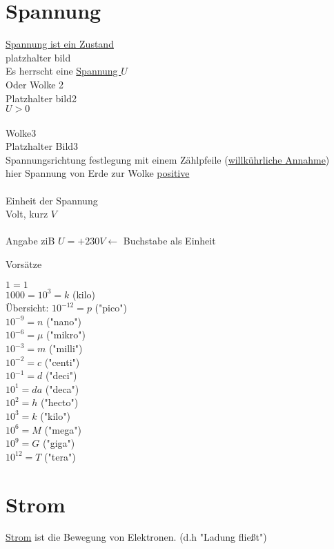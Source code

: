 \section{Spannung}
\underline{Spannung ist ein Zustand}\\
platzhalter bild\\
Es herrscht eine \underline{Spannung $U$}\\
Oder Wolke 2\\
Platzhalter bild2\\
$ U > 0 $\\
\\

Wolke3\\
Platzhalter Bild3\\

Spannungsrichtung festlegung mit einem Zählpfeile (\underline{willkührliche Annahme})\\
hier Spannung von Erde zur Wolke \underline{positive}\\
\\
Einheit der Spannung\\
Volt, kurz $V$\\
\\
Angabe ziB $U = + 230 V \leftarrow $ Buchstabe als Einheit\\

\newpage

Vorsätze

$ 1 =1 $\\
$ 1000 = 10^3 = k $ (kilo)\\
Übersicht:
$ 10^{-12} = p $ ("pico")\\
$ 10^{-9} = n $ ("nano")\\
$ 10^{-6} = \mu $ ("mikro")\\
$ 10^{-3} = m $ ("milli")\\
$ 10^{-2} = c $ ("centi")\\
$ 10^{-1} = d $ ("deci")\\
$ 10^{1} = da $ ("deca")\\
$ 10^{2} = h $ ("hecto")\\
$ 10^{3} = k $ ("kilo")\\
$ 10^{6} = M $ ("mega")\\
$ 10^{9} = G $ ("giga")\\
$ 10^{12} = T $ ("tera")\\


\section{Strom}

\underline{Strom} ist die Bewegung von Elektronen. (d.h "Ladung fließt")


